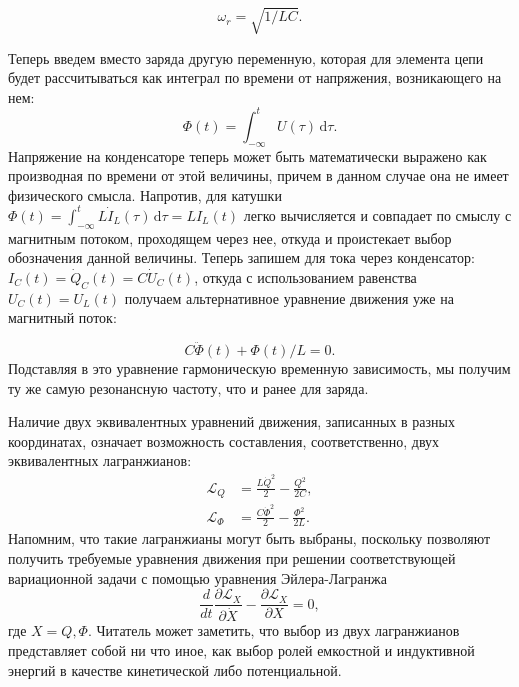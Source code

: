 \documentclass[14pt, a4paper]{extreport}
\newcommand{\diff}{\,\mathrm{d}}
\numberwithin{equation}{section}
\begin{document}
\begin{equation}
	\omega_r = \sqrt{1/LC}.
\end{equation}

Теперь введем вместо заряда другую переменную, которая для элемента цепи будет рассчитываться как интеграл по времени от напряжения, возникающего на нем:
\begin{equation}
	\Phi(t) = \int_{-\infty}^{t} U(\tau) \diff \tau.\label{eq:phi_variable}
\end{equation}
Напряжение на конденсаторе теперь может быть математически выражено как производная по времени от этой величины, причем в данном случае она не имеет физического смысла. Напротив, для катушки $\Phi(t) = \int_{-\infty}^{t} L \dot I_L(\tau) \diff \tau = LI_L(t)	$  легко вычисляется и совпадает по смыслу с магнитным потоком, проходящем через нее, откуда и проистекает выбор обозначения данной величины. Теперь запишем для тока через конденсатор: $I_C(t) = \dot Q_C(t) = C \dot U_C(t)$, откуда с использованием равенства $U_C(t) = U_L(t)$ получаем альтернативное уравнение движения уже на магнитный поток:

\begin{equation}
	C \ddot \Phi(t) + \Phi(t)/L = 0.
\end{equation}
Подставляя в это уравнение гармоническую временную зависимость, мы получим ту же самую резонансную частоту, что и ранее для заряда.

Наличие двух эквивалентных уравнений движения, записанных в разных координатах, означает возможность составления, соответственно, двух эквивалентных лагранжианов:
\begin{align}
	\mathcal{L}_Q &= \frac{L \dot Q^2}{2} - \frac{Q^2}{2 C},\\
	\mathcal{L}_\Phi &= \frac{C\dot \Phi^2}{2} - \frac{\Phi^2}{2 L}.
\end{align}
Напомним, что такие лагранжианы могут быть выбраны, поскольку позволяют получить требуемые уравнения движения при решении соответствующей вариационной задачи с помощью уравнения Эйлера-Лагранжа
\begin{equation}
\frac{d}{d t}\frac{\partial \mathcal{L}_X}{\partial \dot X} - \frac{\partial \mathcal{L}_X}{\partial X} = 0,
\end{equation}
где $X = Q, \Phi$. Читатель может заметить, что выбор из двух лагранжианов представляет собой ни что иное, как выбор ролей емкостной и индуктивной энергий в качестве кинетической либо потенциальной. 
\end{document}

